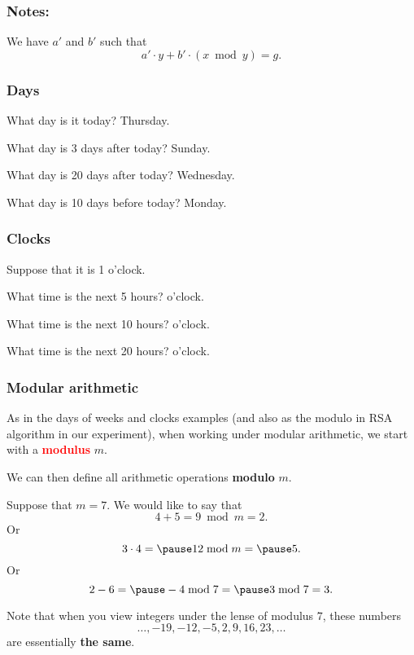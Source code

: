 \begin{frame}
  \frametitle{Notes:}

  We have $a'$ and $b'$ such that
  \[
  a'\cdot y + b'\cdot(x \bmod y) = g.
  \]

  \vspace{3in}
\end{frame}


\begin{frame}
  \frametitle{Days}

  What day is it today? \pause Thursday.

  \pause
  What day is 3 days after today? \pause Sunday.
  
  \pause
  What day is 20 days after today? \pause Wednesday.

  \pause
  What day is 10 days before today? \pause Monday.
\end{frame}

\begin{frame}
  \frametitle{Clocks}

  Suppose that it is 1 o'clock.

  \pause
  What time is the next 5 hours?   o'clock.
  
  \pause
  What time is the next 10 hours?   o'clock.
  
  \pause
  What time is the next 20 hours?   o'clock.
  
\end{frame}

\begin{frame}
  \frametitle{Modular arithmetic}

  As in the days of weeks and clocks examples (and also as the modulo
  in RSA algorithm in our experiment), when working under modular
  arithmetic, we start with a \textcolor{red}{\bf modulus} $m$.

  \vspace{0.1in}
  \pause
  We can then define all arithmetic operations {\bf modulo} $m$.

  \vspace{0.1in}
  \pause
  Suppose that $m=7$.  We would like to say that
  {\small
  \[
  4 + 5 = 9 \bmod m= 2.
  \]
  Or
  \[
  3\cdot 4 = \pause 12 \bmod m = \pause 5.
  \]
  Or
  \[
  2 - 6 = \pause -4 \bmod 7 = \pause 3 \bmod 7 = 3.
  \]
  }

  \pause
  Note that when you view integers under the lense of modulus $7$,
  these numbers
  \[
  \ldots,-19,-12,-5,2,9,16,23,\ldots
  \]
  are essentially {\bf the same}.
\end{frame}

